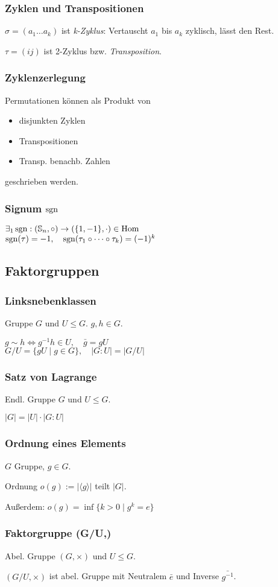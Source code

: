 \subsubsection*{Zyklen und Transpositionen}
$\sigma = (a_1 \dots a_k)$ ist \textit{k-Zyklus}:
Vertauscht $a_1$ bis $a_k$ zyklisch, lässt den Rest.

$\tau  = (i j)$ ist 2-Zyklus bzw. \textit{Transposition}.

\subsubsection*{Zyklenzerlegung}
Permutationen können als Produkt von
\begin{itemize}
	\item disjunkten Zyklen
	\item Transpositionen
	\item Transp. benachb. Zahlen
\end{itemize}
geschrieben werden.

\subsubsection*{Signum $\operatorname{sgn}$}
$\exists_1 \operatorname{sgn} : (\mathbb{S}_n, \circ) \to (\{1,-1\},\cdot) \in \operatorname{Hom}$ \\
$\operatorname{sgn}(\tau)=-1, \quad \operatorname{sgn}(\tau_1 \circ \dots \circ \tau_k)=(-1)^k$

\subsection*{Faktorgruppen}

\subsubsection*{Linksnebenklassen}
Gruppe $G$ und $U\le G$. $g,h\in G$.

$ g \sim h \iff g^{-1}h\in U,\quad \bar g = gU$\\
$ G/U = \{gU \mid g \in G \}, \quad |G:U| = |G/U| $

\subsubsection*{Satz von Lagrange}
Endl. Gruppe $G$ und $U \le G$.

$|G| = |U|\cdot|G:U|$

\subsubsection*{Ordnung eines Elements}
$G$ Gruppe, $g\in G$.

Ordnung $o(g):=|\langle g \rangle|$ teilt $|G|$.

Außerdem: $o(g)=\inf\{k>0 \mid g^k = e\}$

\subsubsection*{Faktorgruppe (G/U,\times)}
Abel. Gruppe $(G,\times)$ und $U \le G$.

$(G/U,\times)$ ist abel. Gruppe mit
Neutralem $\bar e$ und Inverse $\bar{g^{-1}}$.
